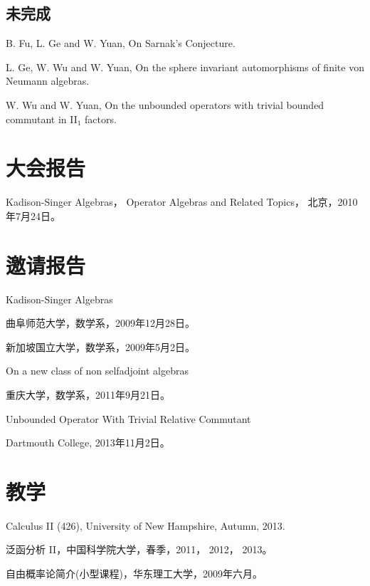 \documentclass[letterpaper]{article}
\renewenvironment{itemize}{
  \begin{list}{}{
    \setlength{\leftmargin}{1.5em}
  }
}{
  \end{list}
}
\begin{document}
   
\subsection*{未完成}
\begin{itemize}
\item B. Fu, L. Ge and W. Yuan, On Sarnak's Conjecture.
\item L. Ge, W. Wu and W. Yuan, On the sphere invariant automorphisms of
finite von Neumann algebras.
\item W. Wu and W. Yuan, On the unbounded operators with trivial
bounded commutant in II$_1$ factors.
\end{itemize}

\section*{大会报告}
\begin{itemize}
  \item Kadison-Singer Algebras， Operator Algebras and Related Topics， 北京，2010年7月24日。
\end{itemize}

\section*{邀请报告}
\begin{itemize}
  \item Kadison-Singer Algebras
  \begin{itemize}
  \item 曲阜师范大学，数学系，2009年12月28日。
  \item 新加坡国立大学，数学系，2009年5月2日。
  \end{itemize}
 \item On a new class of non selfadjoint algebras
  \begin{itemize}
  \item 重庆大学，数学系，2011年9月21日。
  \end{itemize}
  \item Unbounded Operator With Trivial Relative Commutant
     \begin{itemize}
         \item Dartmouth College, 2013年11月2日。
     \end{itemize}
\end{itemize}

\section*{教学}
\begin{itemize}
\item Calculus II (426), University of New Hampshire, Autumn, 2013.
\item 泛函分析 II，中国科学院大学，春季，2011， 2012， 2013。
\item 自由概率论简介(小型课程)，华东理工大学，2009年六月。
\end{itemize}
\end{document}

